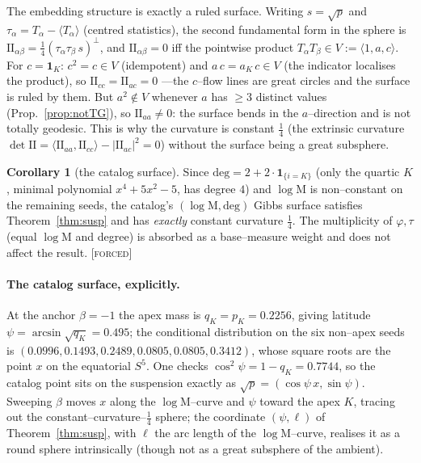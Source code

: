 \documentclass[11pt]{article}
\theoremstyle{definition}
\newtheorem{corollary}[theorem]{Corollary}
\newcommand{\ph}{\varphi}
\newcommand{\Mah}{\mathrm{M}}
\newcommand{\forcedtag}{{\scshape [forced]}}
\begin{document}
The embedding structure is exactly a ruled surface. Writing $s=\sqrt p$ and $\tau_\alpha=T_\alpha-\langle
T_\alpha\rangle$ (centred statistics), the second fundamental form in the sphere is $\mathrm{II}_{\alpha
\beta}=\tfrac14(\tau_\alpha\tau_\beta\,s)^\perp$, and $\mathrm{II}_{\alpha\beta}=0$ iff the pointwise
product $T_\alpha T_\beta\in V:=\langle 1,a,c\rangle$. For $c=\mathbf 1_K$: $c^2=c\in V$ (idempotent)
and $a\,c=a_K\,c\in V$ (the indicator localises the product), so $\mathrm{II}_{cc}=\mathrm{II}_{ac}=0$
---the $c$--flow lines are great circles and the surface is ruled by them. But $a^2\notin V$ whenever
$a$ has $\ge3$ distinct values (Prop.~\ref{prop:notTG}), so $\mathrm{II}_{aa}\neq0$: the surface bends
in the $a$--direction and is not totally geodesic. This is why the curvature is constant $\tfrac14$
(the extrinsic curvature $\det\mathrm{II}=\langle\mathrm{II}_{aa},\mathrm{II}_{cc}\rangle-|\mathrm{II}
_{ac}|^2=0$) without the surface being a great subsphere.

\begin{corollary}[the catalog surface]\label{cor:catsurf}
Since $\mathrm{deg}=2+2\cdot\mathbf 1_{\{i=K\}}$ (only the quartic $K$, minimal polynomial
$x^4+5x^2-5$, has degree $4$) and $\log\Mah$ is non--constant on the remaining seeds, the catalog's
$(\log\Mah,\mathrm{deg})$ Gibbs surface satisfies Theorem~\ref{thm:susp} and has \emph{exactly}
constant curvature $\tfrac14$. The multiplicity of $\ph,\tau$ (equal $\log\Mah$ and degree) is
absorbed as a base--measure weight and does not affect the result. \forcedtag
\end{corollary}

\paragraph{The catalog surface, explicitly.} At the anchor $\beta=-1$ the apex mass is
$q_K=p_K=0.2256$, giving latitude $\psi=\arcsin\sqrt{q_K}=0.495$; the conditional distribution on the
six non--apex seeds is $(0.0996,0.1493,0.2489,0.0805,0.0805,0.3412)$, whose square roots are the
point $x$ on the equatorial $S^5$. One checks $\cos^2\psi=1-q_K=0.7744$, so the catalog point sits on
the suspension exactly as $\sqrt p=(\cos\psi\,x,\sin\psi)$. Sweeping $\beta$ moves $x$ along the
$\log\Mah$--curve and $\psi$ toward the apex $K$, tracing out the constant--curvature--$\tfrac14$
sphere; the coordinate $(\psi,\ell)$ of Theorem~\ref{thm:susp}, with $\ell$ the arc length
of the $\log\Mah$--curve, realises it as a round sphere intrinsically (though not as a great subsphere
of the ambient).
\end{document}
